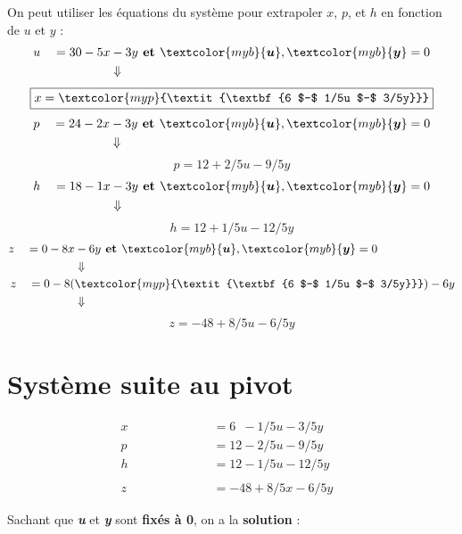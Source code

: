 \documentclass{report}
\begin{document}
\begin{multicols*}{2}
On peut utiliser les équations du système pour extrapoler 
$x$, $p$, et $h$ en fonction de $u$ et $y$ :
\begin{align*}
    u \quad = 30 - 5x &- 3y 
    \textbf{ et } \textcolor{myb}{\boldsymbol{u}}, \textcolor{myb}{\boldsymbol{y}} = 0 
    \\
                         &\Downarrow
\end{align*}
      \[%
          \boxed{x = \textcolor{myp}{\textit{\textbf{6 $-$ 1/5u $-$ 3/5y}}}}
      \]%
\begin{align*}
    p \quad = 24 - 2x &- 3y
    \textbf{ et } \textcolor{myb}{\boldsymbol{u}}, \textcolor{myb}{\boldsymbol{y}} = 0 
    \\
                 &\Downarrow
\end{align*}
      \[%
    \boxed{p = 12 +2/5u -9/5y}
      \]%
\begin{align*}
    h \quad = 18 -1x &- 3y
    \textbf{ et } \textcolor{myb}{\boldsymbol{u}}, \textcolor{myb}{\boldsymbol{y}} = 0 
    \\
                     &\Downarrow
\end{align*}
      \[%
    \boxed{h = 12 +1/5u -12/5y}
      \]%
\begin{align*}
    z \quad = 0 - 8x &- 6y
    \textbf{ et } \textcolor{myb}{\boldsymbol{u}}, \textcolor{myb}{\boldsymbol{y}}  = 0 
    \\
                     &\Downarrow
    \\
    z \quad = 0 - 8(&\textcolor{myp}{\textit{\textbf{6 $-$ 1/5u $-$ 3/5y}}})
 - 6y
    \\ 
                    &\Downarrow
\end{align*}
      \[%
    \boxed{z = -48 +8/5u -6/5y}
      \]%

\section{Système suite au pivot}
\begin{align*}
    x \quad\quad\quad\quad\quad\quad &= 6\phantom{2} - 1/5u -3/5y& \\
    p \quad\quad\quad\quad  &= 12 -2/5u -9/5y& \\
    h \quad\quad &= 12 - 1/5u -12/5y& \\ \\
    z \quad  &= -48 +8/5x -6/5y
\end{align*}

Sachant que 
\textcolor{myb}{\textbf{\textit{u}}} et 
\textcolor{myb}{\textbf{\textit{y}}}  sont \textbf{fixés à 0}, 
on a la \textbf{solution} : 


\end{multicols*}
\end{document}
